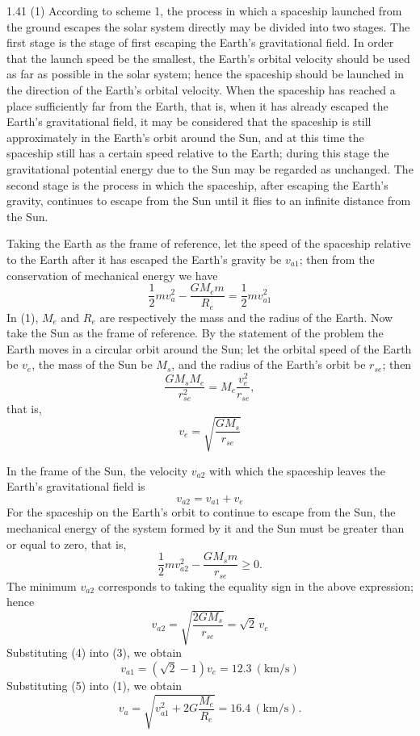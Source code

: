 \begin{solution}{1.41}
(1) According to scheme 1, the process in which a spaceship launched from the ground escapes the solar system directly may be divided into two stages. The first stage is the stage of first escaping the Earth's gravitational field. In order that the launch speed be the smallest, the Earth's orbital velocity should be used as far as possible in the solar system; hence the spaceship should be launched in the direction of the Earth's orbital velocity. When the spaceship has reached a place sufficiently far from the Earth, that is, when it has already escaped the Earth's gravitational field, it may be considered that the spaceship is still approximately in the Earth's orbit around the Sun, and at this time the spaceship still has a certain speed relative to the Earth; during this stage the gravitational potential energy due to the Sun may be regarded as unchanged. The second stage is the process in which the spaceship, after escaping the Earth's gravity, continues to escape from the Sun until it flies to an infinite distance from the Sun.

Taking the Earth as the frame of reference, let the speed of the spaceship relative to the Earth after it has escaped the Earth's gravity be $v_{a1}$; then from the conservation of mechanical energy we have
\begin{equation}
\frac{1}{2}mv_a^2-\frac{GM_em}{R_e}=\frac{1}{2}mv_{a1}^2 \tag{1}
\end{equation}
In (1), $M_e$ and $R_e$ are respectively the mass and the radius of the Earth. Now take the Sun as the frame of reference. By the statement of the problem the Earth moves in a circular orbit around the Sun; let the orbital speed of the Earth be $v_e$, the mass of the Sun be $M_s$, and the radius of the Earth's orbit be $r_{se}$; then
\[
\frac{GM_sM_e}{r_{se}^2}=M_e\frac{v_e^2}{r_{se}},
\]
that is,
\begin{equation}
v_e=\sqrt{\frac{GM_s}{r_{se}}} \tag{2}
\end{equation}

In the frame of the Sun, the velocity $v_{a2}$ with which the spaceship leaves the Earth's gravitational field is
\begin{equation}
v_{a2}=v_{a1}+v_e \tag{3}
\end{equation}
For the spaceship on the Earth's orbit to continue to escape from the Sun, the mechanical energy of the system formed by it and the Sun must be greater than or equal to zero, that is,
\[
\frac{1}{2}mv_{a2}^2-\frac{GM_sm}{r_{se}}\ge 0.
\]
The minimum $v_{a2}$ corresponds to taking the equality sign in the above expression; hence
\begin{equation}
v_{a2}=\sqrt{\frac{2GM_s}{r_{se}}}=\sqrt{2}\,v_e \tag{4}
\end{equation}
Substituting (4) into (3), we obtain
\begin{equation}
v_{a1}=(\sqrt{2}-1)v_e=12.3\ (\mathrm{km/s}) \tag{5}
\end{equation}
Substituting (5) into (1), we obtain
\[
v_a=\sqrt{v_{a1}^2+2G\frac{M_e}{R_e}}=16.4\ (\mathrm{km/s}).
\]


\end{solution}
